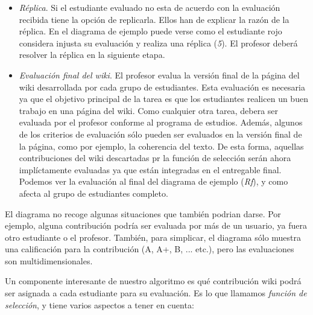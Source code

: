 \begin{itemize}
\item \emph{Réplica}. Si el estudiante evaluado no esta de acuerdo con la evaluación recibida tiene la opción de replicarla. Ellos han de explicar la razón de la réplica. En el diagrama de ejemplo puede verse como el estudiante rojo considera injusta su evaluación y realiza una réplica (\emph{5}). El profesor deberá resolver la réplica en la siguiente etapa.
\item \emph{Evaluación final del wiki}. El profesor evalua la versión final de la página del wiki desarrollada por cada grupo de estudiantes. Esta evaluación es necesaria ya que el objetivo principal de la tarea es que los estudiantes realicen un buen trabajo en una página del wiki. Como cualquier otra tarea, debera ser evaluada por el profesor conforme al programa de estudios. Además, algunos de los criterios de evaluación sólo pueden ser evaluados en la versión final de la página, como por ejemplo, la coherencia del texto. De esta forma, aquellas contribuciones del wiki descartadas pr la función de selección serán ahora implíctamente evaluadas ya que están integradas en el entregable final. Podemos ver la evaluación al final del diagrama de ejemplo (\emph{Rf}), y como afecta al grupo de estudiantes completo.
\end{itemize}

El diagrama no recoge algunas situaciones que también podrian darse. Por ejemplo, alguna contribución podría ser evaluada por más de un usuario, ya fuera otro estudiante o el profesor. También, para simplicar, el diagrama sólo muestra una calificación para la contribución (A, A+, B, ... etc.), pero las evaluaciones son multidimensionales.

Un componente interesante de nuestro algoritmo es qué contribución wiki podrá ser asignada a cada estudiante para su evaluación. Es lo que llamamos \emph{función de selección}, y tiene varios aspectos a tener en cuenta:

